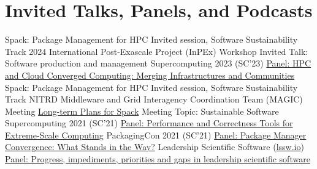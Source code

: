 \section{Invited Talks, Panels, and Podcasts}
		{\newline Spack: Package Management for HPC}
		{Invited session, Software Sustainability Track}
        {}{}{}
                {2024 International Post-Exascale Project (InPEx) Workshop}
		{\newline Invited Talk: Software production and management}
		{}
        {}{}{}
                {Supercomputing 2023 (SC'23)}
		{\newline \href{https://sc23.conference-program.com/presentation/?id=pan110&sess=sess193}{Panel: HPC and Cloud Converged Computing: Merging Infrastructures and Communities}}
		{}
        {}{}{}
		{\newline Spack: Package Management for HPC}
		{Invited session, Software Sustainability Track}
        {}{}{}
                {NITRD Middleware and Grid Interagency Coordination Team (MAGIC) Meeting}
		{\newline \href{https://www.nitrd.gov/nitrdgroups/images/2021/MAGIC-Todd-Gamblin-12012021.pdf}{Long-term Plans for Spack}}
		{Meeting Topic: Sustainable Software}
        {}{}{}
                {Supercomputing 2021 (SC'21)}
		{\newline \href{https://sc21.supercomputing.org/presentation/?id=pan129&sess=sess236}{Panel: Performance and Correctness Tools for Extreme-Scale Computing}}
		{}
        {}{}{}
                {PackagingCon 2021 (SC'21)}
		{\newline \href{https://www.youtube.com/watch?v=NuaDWoOwPA0}{Panel: Package Manager Convergence: What Stands in the Way?}}
		{}
        {}{}{}
                {Leadership Scientific Software (\href{https://lssw.io}{lssw.io})}
		{\newline \href{https://leadershipscientificsoftware.github.io/Meeting2.html}{Panel: Progress, impediments, priorities and gaps in leadership scientific software}}

